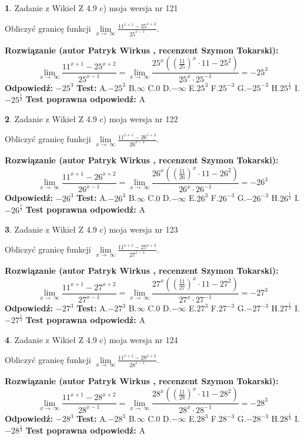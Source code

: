 \documentclass[12pt, a4paper]{article}
\theoremstyle{definition} %
\newtheorem{zad}{}
\newcommand{\zadStart}[1]{\begin{zad}#1\newline}
\newcommand{\zadStop}{\end{zad}}
\newcommand{\rozwStart}[2]{\noindent \textbf{Rozwiązanie (autor #1 , recenzent #2): }\newline}
\newcommand{\rozwStop}{\newline}
\newcommand{\odpStart}{\noindent \textbf{Odpowiedź:}\newline}
\newcommand{\odpStop}{\newline}
\newcommand{\testStart}{\noindent \textbf{Test:}\newline}
\newcommand{\testStop}{\newline}
\newcommand{\kluczStart}{\noindent \textbf{Test poprawna odpowiedź:}\newline}
\newcommand{\kluczStop}{\newline}
\begin{document}
\zadStart{Zadanie z Wikieł Z 4.9 c) moja wersja nr 121}


Obliczyć granicę funkcji  $\lim\limits_{x\to\ \infty}\frac{11^{x+1}-25^{x+2}}{25^{x-1}}$.
\zadStop
\rozwStart{Patryk Wirkus}{Szymon Tokarski}
$$\lim\limits_{x\to\ \infty}\frac{11^{x+1}-25^{x+2}}{25^{x-1}}=\lim\limits_{x\to\ \infty}\frac{25^{x}((\frac{11}{25})^{x}\cdot 11 -25^{2})}{25^{x}\cdot 25^{-1}} = -25^{3}$$
\rozwStop
\odpStart
$-25^{3}$
\odpStop
\testStart
A.$-25^{3}$ B.$\infty$ C.$0$ D.$-\infty$ E.$25^{3}$
F.$25^{-3}$ G.$-25^{-3}$
H.$25^{\frac{1}{3}}$
I.$-25^{\frac{1}{3}}$
\testStop
\kluczStart
A
\kluczStop



\zadStart{Zadanie z Wikieł Z 4.9 c) moja wersja nr 122}


Obliczyć granicę funkcji  $\lim\limits_{x\to\ \infty}\frac{11^{x+1}-26^{x+2}}{26^{x-1}}$.
\zadStop
\rozwStart{Patryk Wirkus}{Szymon Tokarski}
$$\lim\limits_{x\to\ \infty}\frac{11^{x+1}-26^{x+2}}{26^{x-1}}=\lim\limits_{x\to\ \infty}\frac{26^{x}((\frac{11}{26})^{x}\cdot 11 -26^{2})}{26^{x}\cdot 26^{-1}} = -26^{3}$$
\rozwStop
\odpStart
$-26^{3}$
\odpStop
\testStart
A.$-26^{3}$ B.$\infty$ C.$0$ D.$-\infty$ E.$26^{3}$
F.$26^{-3}$ G.$-26^{-3}$
H.$26^{\frac{1}{3}}$
I.$-26^{\frac{1}{3}}$
\testStop
\kluczStart
A
\kluczStop



\zadStart{Zadanie z Wikieł Z 4.9 c) moja wersja nr 123}


Obliczyć granicę funkcji  $\lim\limits_{x\to\ \infty}\frac{11^{x+1}-27^{x+2}}{27^{x-1}}$.
\zadStop
\rozwStart{Patryk Wirkus}{Szymon Tokarski}
$$\lim\limits_{x\to\ \infty}\frac{11^{x+1}-27^{x+2}}{27^{x-1}}=\lim\limits_{x\to\ \infty}\frac{27^{x}((\frac{11}{27})^{x}\cdot 11 -27^{2})}{27^{x}\cdot 27^{-1}} = -27^{3}$$
\rozwStop
\odpStart
$-27^{3}$
\odpStop
\testStart
A.$-27^{3}$ B.$\infty$ C.$0$ D.$-\infty$ E.$27^{3}$
F.$27^{-3}$ G.$-27^{-3}$
H.$27^{\frac{1}{3}}$
I.$-27^{\frac{1}{3}}$
\testStop
\kluczStart
A
\kluczStop



\zadStart{Zadanie z Wikieł Z 4.9 c) moja wersja nr 124}


Obliczyć granicę funkcji  $\lim\limits_{x\to\ \infty}\frac{11^{x+1}-28^{x+2}}{28^{x-1}}$.
\zadStop
\rozwStart{Patryk Wirkus}{Szymon Tokarski}
$$\lim\limits_{x\to\ \infty}\frac{11^{x+1}-28^{x+2}}{28^{x-1}}=\lim\limits_{x\to\ \infty}\frac{28^{x}((\frac{11}{28})^{x}\cdot 11 -28^{2})}{28^{x}\cdot 28^{-1}} = -28^{3}$$
\rozwStop
\odpStart
$-28^{3}$
\odpStop
\testStart
A.$-28^{3}$ B.$\infty$ C.$0$ D.$-\infty$ E.$28^{3}$
F.$28^{-3}$ G.$-28^{-3}$
H.$28^{\frac{1}{3}}$
I.$-28^{\frac{1}{3}}$
\testStop
\kluczStart
A
\kluczStop
\end{document}
